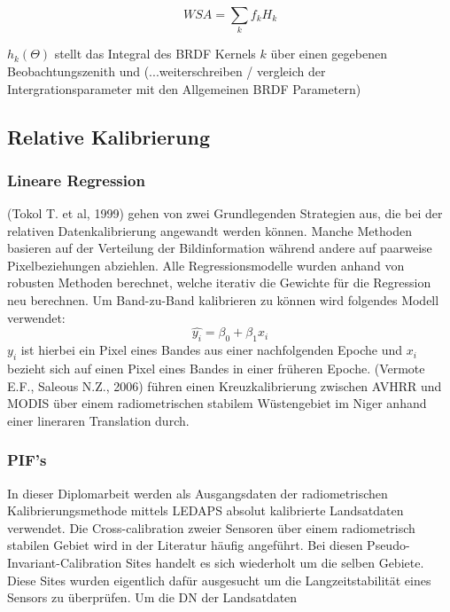 \documentclass[11pt]{report}
\begin{document}
\begin{equation}
WSA = \sum_{k}f_kH_k
\end{equation}

$h_k(\Theta)$  stellt das Integral des BRDF Kernels $k$ über einen gegebenen Beobachtungszenith und (...weiterschreiben / vergleich der Intergrationsparameter mit den Allgemeinen BRDF Parametern)




\subsection{Relative Kalibrierung}
\subsubsection{Lineare Regression}
(Tokol T. et al, 1999) gehen von zwei Grundlegenden Strategien aus, die bei der relativen Datenkalibrierung angewandt werden können. Manche Methoden basieren auf der Verteilung der Bildinformation während andere auf paarweise Pixelbeziehungen abziehlen. Alle Regressionsmodelle wurden anhand von robusten Methoden berechnet, welche iterativ die Gewichte für die Regression neu berechnen. Um Band-zu-Band kalibrieren zu können wird folgendes Modell verwendet:
\begin{equation}
\hat{y_i}=\beta_0+\beta_1x_i
\end{equation}
$y_i$ ist hierbei ein Pixel eines Bandes aus einer nachfolgenden Epoche und $x_i$ bezieht sich auf einen Pixel eines Bandes in einer früheren Epoche. (Vermote E.F., Saleous N.Z., 2006) führen einen Kreuzkalibrierung zwischen AVHRR und MODIS über einem radiometrischen stabilem Wüstengebiet im Niger anhand einer lineraren Translation durch.


\subsubsection{PIF's}

In dieser Diplomarbeit werden als Ausgangsdaten der radiometrischen Kalibrierungsmethode mittels LEDAPS absolut kalibrierte Landsatdaten verwendet. 
Die Cross-calibration zweier Sensoren über einem radiometrisch stabilen Gebiet wird in der Literatur häufig angeführt. Bei diesen Pseudo-Invariant-Calibration Sites handelt es sich wiederholt um die selben Gebiete. Diese Sites wurden eigentlich dafür ausgesucht um die Langzeitstabilität eines Sensors zu überprüfen. Um die DN der Landsatdaten 


% 
\end{document}
